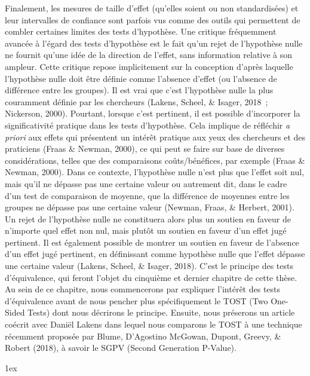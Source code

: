 \documentclass[
  12pt,
  french,
]{article}
\begin{document}
Finalement, les mesures de taille d'effet (qu'elles soient ou non
standardisées) et leur intervalles de confiance sont parfois vus comme
des outils qui permettent de combler certaines limites des tests
d'hypothèse. Une critique fréquemment avancée à l'égard des tests
d'hypothèse est le fait qu'un rejet de l'hypothèse nulle ne fournit
qu'une idée de la direction de l'effet, sans information relative à son
ampleur. Cette critique repose implicitement sur la conception d'après
laquelle l'hypothèse nulle doit être définie comme l'absence d'effet (ou
l'absence de différence entre les groupes). Il est vrai que c'est
l'hypothèse nulle la plus couramment définie par les chercheurs (Lakens,
Scheel, \& Isager, 2018~; Nickerson, 2000). Pourtant, lorsque c'est
pertinent, il est possible d'incorporer la significativité pratique dans
les tests d'hypothèse. Cela implique de réfléchir \emph{a priori} aux
effets qui présentent un intérêt pratique aux yeux des chercheurs et des
praticiens (Fraas \& Newman, 2000), ce qui peut se faire sur base de
diverses considérations, telles que des comparaisons coûts/bénéfices,
par exemple (Fraas \& Newman, 2000). Dans ce contexte, l'hypothèse nulle
n'est plus que l'effet soit nul, mais qu'il ne dépasse pas une certaine
valeur ou autrement dit, dans le cadre d'un test de comparaison de
moyenne, que la différence de moyennes entre les groupes ne dépasse pas
une certaine valeur (Newman, Fraas, \& Herbert, 2001). Un rejet de
l'hypothèse nulle ne constituera alors plus un soutien en faveur de
n'importe quel effet non nul, mais plutôt un soutien en faveur d'un
effet jugé pertinent. Il est également possible de montrer un soutien en
faveur de l'absence d'un effet jugé pertinent, en définissant comme
hypothèse nulle que l'effet dépasse une certaine valeur (Lakens, Scheel,
\& Isager, 2018). C'est le principe des tests d'équivalence, qui feront
l'objet du cinquième et dernier chapitre de cette thèse. Au sein de ce
chapitre, nous commencerons par expliquer l'intérêt des tests
d'équivalence avant de nous pencher plus spécifiquement le TOST (Two
One-Sided Tests) dont nous décrirons le principe. Ensuite, nous
préserons un article coécrit avec Daniël Lakens dans lequel nous
comparons le TOST à une technique récemment proposée par Blume,
D'Agostino McGowan, Dupont, Greevy, \& Robert (2018), à savoir le SGPV
(Second Generation P-Value).

\begingroup
\parindent 0pt
\renewcommand\notesname{{\normalsize Notes de fin de chapitre}}

\parskip 1ex \theendnotes \endgroup
\end{document}
